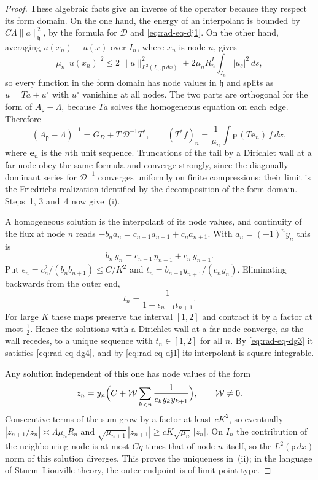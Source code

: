 \begin{proof}
These algebraic facts give an inverse of the operator because they
respect its form domain. On the one hand, the energy of an interpolant
is bounded by $C\Lambda\|a\|_{\mathfrak h}^2$, by the formula for
$\mathcal D$ and \eqref{eq:rad-eq-dj1}. On the other hand, averaging
$u(x_n)-u(x)$ over $I_n$, where $x_n$ is node $n$, gives
\[
 \mu_n\,|u(x_n)|^2\le2\,\|u\|_{L^2(I_n,\mathsf p\,dx)}^2
            +2\mu_nR_n^I\int_{I_n}|u_s|^2\,ds ,
\]
so every function in the form domain has node values in $\mathfrak h$
and splits as $u=Ta+u^\circ$ with $u^\circ$ vanishing at all nodes.
The two parts are orthogonal for the form of $A_{\mathsf p}-\Lambda$,
because $Ta$ solves the homogeneous equation on each edge. Therefore
\begin{equation}\label{eq:rad-eq-dj2}
 (A_{\mathsf p}-\Lambda)^{-1}=G_D+T\,\mathcal D^{-1}T^*,
 \qquad (T^*f)_n=\frac1{\mu_n}\int\mathsf p\,(T\mathbf e_n)\,f\,dx ,
\end{equation}
where $\mathbf e_n$ is the $n$th unit sequence. Truncations of the
tail by a Dirichlet wall at a far node obey the same formula and
converge strongly, since the diagonally dominant series for
$\mathcal D^{-1}$ converges uniformly on finite compressions; their
limit is the Friedrichs realization identified by the decomposition
of the form domain. Steps~1, 3 and~4 now give~(i).

A homogeneous solution is the interpolant of its node values, and
continuity of the flux at node $n$ reads
$-b_na_n=c_{n-1}a_{n-1}+c_na_{n+1}$. With $a_n=(-1)^ny_n$ this is
\[
 b_n\,y_n=c_{n-1}\,y_{n-1}+c_n\,y_{n+1}.
\]
Put $\epsilon_n=c_n^2/(b_nb_{n+1})\le C/K^2$ and
$t_n=b_{n+1}y_{n+1}/(c_ny_n)$. Eliminating backwards from the outer
end,
\[
 t_n=\frac1{1-\epsilon_{n+1}t_{n+1}} .
\]
For large $K$ these maps preserve the interval $[1,2]$ and contract
it by a factor at most $\tfrac12$. Hence the solutions with a
Dirichlet wall at a far node converge, as the wall recedes, to a
unique sequence with $t_n\in[1,2]$ for all $n$. By
\eqref{eq:rad-eq-dg3} it satisfies \eqref{eq:rad-eq-dg4}, and by
\eqref{eq:rad-eq-dj1} its interpolant is square integrable.

Any solution independent of this one has node values of the form
\[
 z_n=y_n\Bigl(C+\mathcal W\sum_{k<n}\frac1{c_ky_ky_{k+1}}\Bigr),
 \qquad\mathcal W\ne0 .
\]
Consecutive terms of the sum grow by a factor at least $cK^2$, so
eventually $|z_{n+1}/z_n|\asymp\Lambda\mu_nR_n$ and
$\sqrt{\mu_{n+1}}\,|z_{n+1}|\ge cK\sqrt{\mu_n}\,|z_n|$. On $I_n$ the
contribution of the neighbouring node is at most $C\eta$ times that of
node $n$ itself, so the $L^2(\mathsf p\,dx)$ norm of this solution
diverges. This proves the uniqueness in~(ii); in the language of
Sturm--Liouville theory, the outer endpoint is of limit-point type.


\end{proof}
